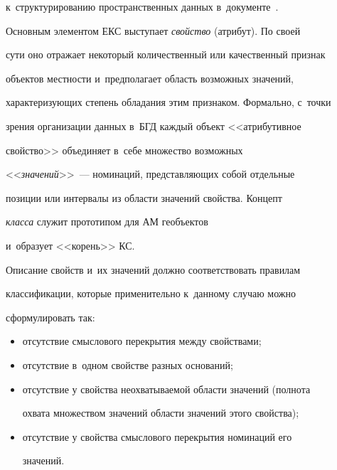 к~структурированию пространственных данных в~документе~\cite{12-nik}.


  


  Основным элементом ЕКС выступает \textit{свойство} (атрибут). По своей 


сути оно отражает некоторый количественный или качественный признак 


объектов местности и~предполагает область возможных значений, 


характеризующих степень обладания этим признаком. Формально, с~точки 


зрения организации данных в~БГД каждый объект <<атрибутивное 


свойство>> объединяет в~себе множество возможных 


<<\textit{значений}>>~--- номинаций, представляющих собой отдельные 


позиции или интервалы из области значений свойства. Концепт 


\textit{класса} служит прототипом для АМ геобъектов 


и~образует <<корень>> КС. 


  


  Описание свойств и~их значений должно соответствовать правилам 


классификации, которые применительно к~данному случаю можно 


сформулировать так:


  \begin{itemize}


  \item отсутствие смыслового перекрытия между свойствами;


  \item отсутствие в~одном свойстве разных оснований;


  \item отсутствие у свойства неохватываемой области значений (полнота 


охвата множеством значений области значений этого свойства);


  \item отсутствие у свойства смыслового перекрытия номинаций его 


значений.


  \end{itemize}


  


